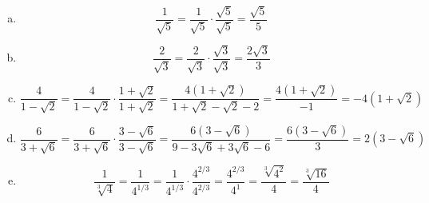 \documentclass[11pt,letterpaper]{article}
\begin{document}
\sol
\begin{enumerate}[(a)]
\item 
	\[
	\dfrac{1}{\sqrt{5}}= \dfrac{1}{\sqrt{5}} \cdot \dfrac{\sqrt{5}}{\sqrt{5}}= \dfrac{\sqrt{5}}{5}
	\] \pspace

\item 
	\[
	\dfrac{2}{\sqrt{3}}= \dfrac{2}{\sqrt{3}} \cdot \dfrac{\sqrt{3}}{\sqrt{3}}= \dfrac{2\sqrt{3}}{3}
	\] \pspace

\item 
	\[
	\dfrac{4}{1 - \sqrt{2}}= \dfrac{4}{1 - \sqrt{2}} \cdot \dfrac{1 + \sqrt{2}}{1 + \sqrt{2}}= \dfrac{4(1 + \sqrt{2})}{1 + \sqrt{2} - \sqrt{2} - 2}= \dfrac{4(1 + \sqrt{2})}{-1}= -4(1 + \sqrt{2})
	\] \pspace

\item 
	\[
	\dfrac{6}{3 + \sqrt{6}}= \dfrac{6}{3 + \sqrt{6}} \cdot \dfrac{3 - \sqrt{6}}{3 - \sqrt{6}}= \dfrac{6(3 - \sqrt{6})}{9 - 3\sqrt{6} + 3\sqrt{6} - 6}= \dfrac{6(3 - \sqrt{6})}{3}= 2(3 - \sqrt{6})
	\] \pspace

\item 
	\[
	\dfrac{1}{\sqrt[3]{4}}= \dfrac{1}{4^{1/3}}= \dfrac{1}{4^{1/3}} \cdot \dfrac{4^{2/3}}{4^{2/3}}= \dfrac{4^{2/3}}{4^1}= \dfrac{\sqrt[3]{4^2}}{4}= \dfrac{\sqrt[3]{16}}{4}
	\]
\end{enumerate}
\end{document}
